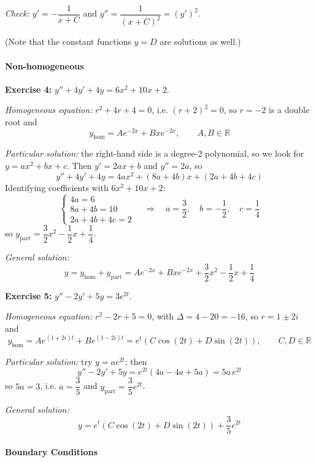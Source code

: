 \documentclass[]{article}
\newcommand{\R}{\mathbb{R}}
\begin{document}
	\textit{Check:} $y' = -\dfrac{1}{x+C}$ and $y'' = \dfrac{1}{(x+C)^2} = (y')^2$. \checkmark

	(Note that the constant functions $y = D$ are solutions as well.)

	\paragraph{Non-homogeneous}\mbox{}

	\textbf{Exercise 4:} $y'' + 4y' + 4y = 6x^2 + 10x + 2$.

	\textit{Homogeneous equation:} $r^2 + 4r + 4 = 0$, i.e. $(r+2)^2 = 0$, so $r = -2$ is a double root and
	$$y_{\text{hom}} = A e^{-2x} + B x e^{-2x}, \qquad A, B \in \R$$

	\textit{Particular solution:} the right-hand side is a degree-2 polynomial, so we look for $y = a x^2 + b x + c$. Then $y' = 2ax + b$ and $y'' = 2a$, so
	$$y'' + 4y' + 4y = 4a x^2 + (8a + 4b) x + (2a + 4b + 4c)$$
	Identifying coefficients with $6x^2 + 10x + 2$:
	$$\begin{cases}
		4a = 6 \\
		8a + 4b = 10 \\
		2a + 4b + 4c = 2
	\end{cases}
	\quad \Longrightarrow \quad
	a = \frac{3}{2}, \quad b = -\frac{1}{2}, \quad c = \frac{1}{4}$$
	so $y_{\text{part}} = \dfrac{3}{2} x^2 - \dfrac{1}{2} x + \dfrac{1}{4}$.

	\textit{General solution:}
	$$y = y_{\text{hom}} + y_{\text{part}} = A e^{-2x} + B x e^{-2x} + \frac{3}{2} x^2 - \frac{1}{2} x + \frac{1}{4}$$

	\textbf{Exercise 5:} $y'' - 2y' + 5y = 3 e^{2t}$.

	\textit{Homogeneous equation:} $r^2 - 2r + 5 = 0$, with $\Delta = 4 - 20 = -16$, so $r = 1 \pm 2i$ and
	$$y_{\text{hom}} = A e^{(1+2i)t} + B e^{(1-2i)t} = e^{t}\left(C \cos(2t) + D \sin(2t)\right), \qquad C, D \in \R$$

	\textit{Particular solution:} try $y = a e^{2t}$; then
	$$y'' - 2y' + 5y = e^{2t}\left(4a - 4a + 5a\right) = 5a\, e^{2t}$$
	so $5a = 3$, i.e. $a = \dfrac{3}{5}$ and $y_{\text{part}} = \dfrac{3}{5} e^{2t}$.

	\textit{General solution:}
	$$y = e^{t}\left(C \cos(2t) + D \sin(2t)\right) + \frac{3}{5} e^{2t}$$

	\paragraph{Boundary Conditions}\mbox{}
\end{document}
